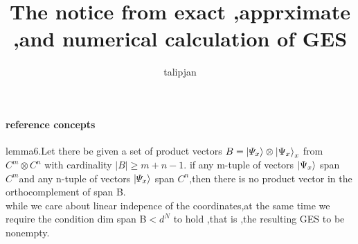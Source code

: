 \documentclass[12pt,twoside]{report}
\title{The  notice from exact ,apprximate ,and numerical calculation of GES}
\author{talipjan}
\begin{document}
	
			
	\paragraph{reference concepts}
	lemma6.Let there be given  a  set of product vectors $B={\ket{\varPsi _{x}}  \otimes \ket{\Psi_{x}} }_{x}$ from $ C^{m}\otimes C^{n} $ with cardinality $ |B|\geq m+n-1. $ if any m-tuple of vectors $ \ket{\Psi_{x}} $ span $ C^{m} $and  any n-tuple of vectors $ \ket{\varPsi_{x}} $ span $ C^{n} $,then there is no product vector in the orthocomplement of span B.	
	\newline\\
	while we care about linear indepence of the coordinates,at the same time we require the condition dim span B$ < d^{N} $ to hold ,that is ,the resulting GES to be nonempty.
\end{document}
